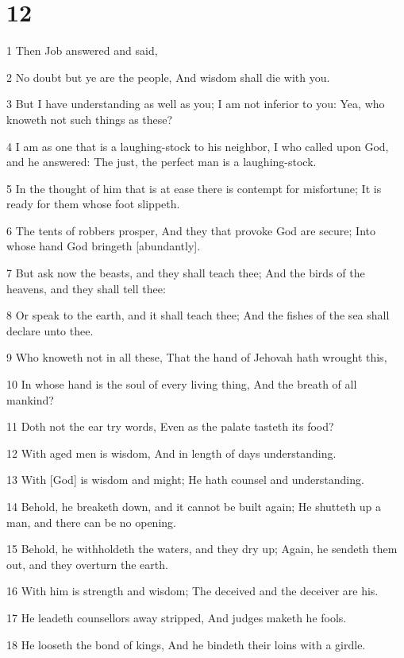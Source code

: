 \chapter{12}

\par 1 Then Job answered and said,
\par 2 No doubt but ye are the people, And wisdom shall die with you.
\par 3 But I have understanding as well as you; I am not inferior to you: Yea, who knoweth not such things as these?
\par 4 I am as one that is a laughing-stock to his neighbor, I who called upon God, and he answered: The just, the perfect man is a laughing-stock.
\par 5 In the thought of him that is at ease there is contempt for misfortune; It is ready for them whose foot slippeth.
\par 6 The tents of robbers prosper, And they that provoke God are secure; Into whose hand God bringeth [abundantly].
\par 7 But ask now the beasts, and they shall teach thee; And the birds of the heavens, and they shall tell thee:
\par 8 Or speak to the earth, and it shall teach thee; And the fishes of the sea shall declare unto thee.
\par 9 Who knoweth not in all these, That the hand of Jehovah hath wrought this,
\par 10 In whose hand is the soul of every living thing, And the breath of all mankind?
\par 11 Doth not the ear try words, Even as the palate tasteth its food?
\par 12 With aged men is wisdom, And in length of days understanding.
\par 13 With [God] is wisdom and might; He hath counsel and understanding.
\par 14 Behold, he breaketh down, and it cannot be built again; He shutteth up a man, and there can be no opening.
\par 15 Behold, he withholdeth the waters, and they dry up; Again, he sendeth them out, and they overturn the earth.
\par 16 With him is strength and wisdom; The deceived and the deceiver are his.
\par 17 He leadeth counsellors away stripped, And judges maketh he fools.
\par 18 He looseth the bond of kings, And he bindeth their loins with a girdle.
